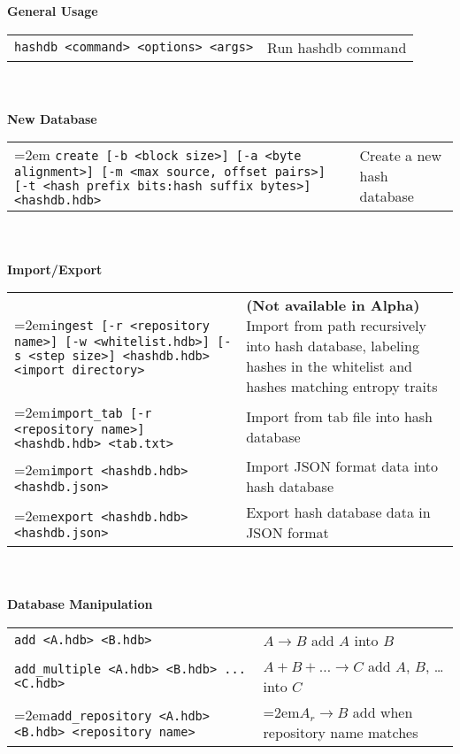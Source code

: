\begin{footnotesize}
\textbf{General Usage} \\
\begin{tabular}{p{3.6 in} p{3.0 in}}
\texttt{hashdb <command> <options> <args>} & Run hashdb command \\
\end{tabular}
\\
\\
\textbf{New Database} \\
\begin{tabular}{p{3.6 in} p{3.0 in}}
\hangindent=2em \texttt{create [-b <block size>] [-a <byte alignment>] [-m <max source, offset pairs>] [-t <hash prefix bits:hash suffix bytes>] <hashdb.hdb>} &
Create a new hash database \\
\end{tabular}
\\
\\
\textbf{Import/Export} \\
\begin{tabular}{p{3.6 in} p{3.0 in}}
\hangindent=2em\texttt{ingest [-r <repository name>] [-w <whitelist.hdb>] [-s <step size>] <hashdb.hdb> <import directory>} &
\textbf{(Not available in Alpha)} Import from path recursively into hash database, labeling hashes in the whitelist and hashes matching entropy traits \\
\hangindent=2em\texttt{import\_tab [-r <repository name>] <hashdb.hdb> <tab.txt>} &
Import from tab file into hash database \\
\hangindent=2em\texttt{import <hashdb.hdb> <hashdb.json>} &
Import JSON format data into hash database \\
\hangindent=2em\texttt{export <hashdb.hdb> <hashdb.json>} &
Export hash database data in JSON format \\
\end{tabular}
\\
\\
\textbf{Database Manipulation} \\
\begin{tabular}{p{3.6 in} p{3.0 in}}
\texttt{add <A.hdb> <B.hdb>} & $A \rightarrow B$ add $A$ into $B$ \\
\texttt{add\_multiple <A.hdb> <B.hdb> ... <C.hdb>} & $A + B + \ldots \rightarrow C$ add $A$, $B$, \ldots into $C$\\
\hangindent=2em\texttt{add\_repository <A.hdb> <B.hdb> <repository name>} & \hangindent=2em$A_r \rightarrow B$ add when repository name matches \\

\end{tabular}
\end{footnotesize}
